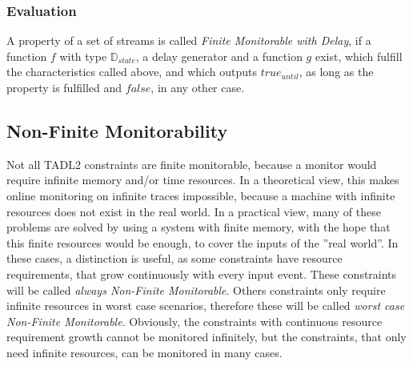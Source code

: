 		\subsubsection{Evaluation}
			A property of a set of streams is called \emph{Finite Monitorable with Delay}, if a function $f$ with type $\mathbb{D}_{state}$, a delay generator and a function $g$ exist, which fulfill the characteristics called above, and which outputs $true_{until}$, as long as the property is fulfilled and $false$, in any other case.
			
	\subsection{Non-Finite Monitorability}
		Not all TADL2 constraints are finite monitorable, because a monitor would require infinite memory and/or time resources. In a theoretical view, this makes online monitoring on infinite traces impossible, because a machine with infinite resources does not exist in the real world. In a practical view, many of these problems are solved by using a system with finite memory, with the hope that this finite resources would be enough, to cover the inputs of the ''real world''. In these cases, a distinction is useful, as some constraints have resource requirements, that grow continuously with every input event. These constraints will be called \emph{always Non-Finite Monitorable}. Others constraints only require infinite resources in worst case scenarios, therefore these will be called \emph{worst case Non-Finite Monitorable}. Obviously, the constraints with continuous resource requirement growth cannot be monitored infinitely, but the constraints, that only need infinite resources, can be monitored in many cases.

	 